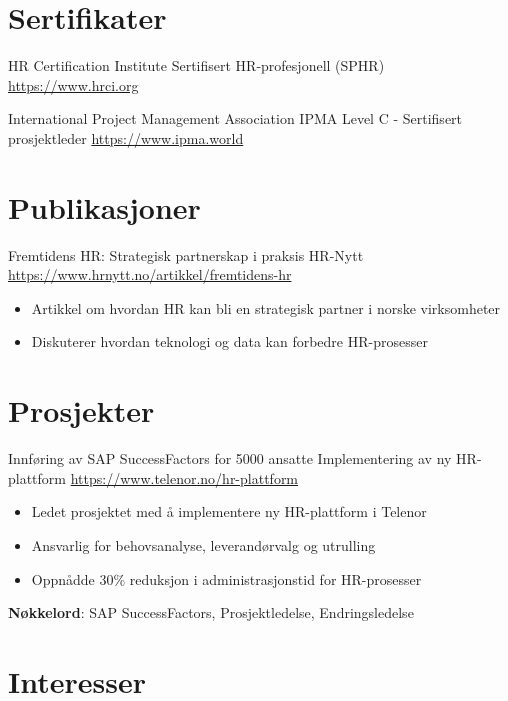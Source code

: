 \documentclass[a4paper, serif, 10pt]{moderncv}
\begin{document}
\section{Sertifikater}

        {HR Certification Institute}
        {Sertifisert HR-profesjonell (SPHR)}
        {\url{https://www.hrci.org}}
        {}
        {}

        {International Project Management Association}
        {IPMA Level C - Sertifisert prosjektleder}
        {\url{https://www.ipma.world}}
        {}
        {}
\section{Publikasjoner}

        {Fremtidens HR: Strategisk partnerskap i praksis}
        {HR-Nytt}
        {\url{https://www.hrnytt.no/artikkel/fremtidens-hr}}
        {}
        {\begin{itemize}
\item Artikkel om hvordan HR kan bli en strategisk partner i norske virksomheter
\item Diskuterer hvordan teknologi og data kan forbedre HR-prosesser
\end{itemize}}
\section{Prosjekter}

        {Innføring av SAP SuccessFactors for 5000 ansatte}
        {Implementering av ny HR-plattform}
        {\url{https://www.telenor.no/hr-plattform}}
        {}
        {\begin{itemize}
\item Ledet prosjektet med å implementere ny HR-plattform i Telenor
\item Ansvarlig for behovsanalyse, leverandørvalg og utrulling
\item Oppnådde 30\% reduksjon i administrasjonstid for HR-prosesser
\end{itemize}
\textbf{Nøkkelord}: SAP SuccessFactors, Prosjektledelse, Endringsledelse}
\section{Interesser}

\end{document}
